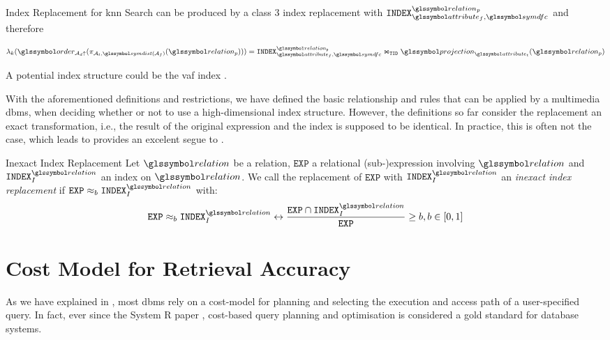 \begin{example}[label=example:index_replacement]{Index Replacement for \acrshort{knn} Search}{}
    can be produced by a class 3 index replacement with $\mathtt{INDEX}^{\relation_{p}}_{\attribute_f, \symdfc}$ and therefore

    \begin{equation*}
        \lambda_k (\order_{\mathcal{A}_d\uparrow} ( \pi_{\mathcal{A}_{t}, \symdist(\mathcal{A}_{f})} ( \relation_p))) = \mathtt{INDEX}^{\relation_{\mathtt{p}}}_{\attribute_f, \symdfc} \Join_{\mathtt{TID}} \projection_{\attribute_{t}} (\relation_p)
    \end{equation*}
    
    A potential index structure could be the \acrshort{vaf} index \cite{Weber:1998Va}.
\end{example}

With the aforementioned definitions and restrictions, we have defined the basic relationship and rules that can be applied by a multimedia \acrshort{dbms}, when deciding whether or not to use a high-dimensional index structure. However, the definitions so far consider the replacement an exact transformation, i.e., the result of the original expression and the index is supposed to be identical. In practice, this is often not the case, which leads to  provides an excelent segue to .

\begin{definition}[label=definition:index_replacement_inexact]{Inexact Index Replacement}{}
    Let $\relation$ be a relation, $\mathtt{EXP}$ a relational (sub-)expression involving $\relation$ and $\mathtt{INDEX}^{\relation}_{I}$ an index on $\relation$. We call the replacement of $\mathtt{EXP}$ with $\mathtt{INDEX}^{\relation}_{I}$ an \emph{inexact index replacement} if $\mathtt{EXP} \approx_{b} \mathtt{INDEX}^{\relation}_{I}$ with:
    \begin{equation*}
        \mathtt{EXP} \approx_{b} \mathtt{INDEX}^{\relation}_{I} \leftrightarrow \frac{\mathtt{EXP} \cap \mathtt{INDEX}^{\relation}_{I}}{\mathtt{EXP}} \geq b, b \in [0, 1]
    \end{equation*}
\end{definition}  

\section{Cost Model for Retrieval Accuracy}
\label{section:cost_model}

As we have explained in , most \acrshort{dbms} rely on a cost-model for planning and selecting the execution and access path of a user-specified query. In fact, ever since the System R paper \cite{Selinger:1979Access}, cost-based query planning and optimisation is considered a gold standard for database systems.

